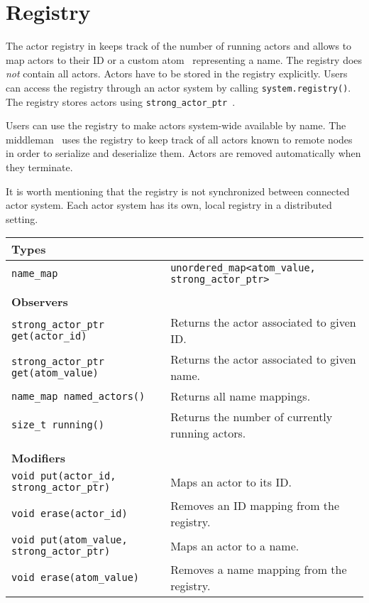 \section{Registry}
\label{registry}

The actor registry in \lib keeps track of the number of running actors and allows to map actors to their ID or a custom atom~ representing a name. The registry does \emph{not} contain all actors. Actors have to be stored in the registry explicitly. Users can access the registry through an actor system by calling \lstinline^system.registry()^. The registry stores actors using \lstinline^strong_actor_ptr^~.

Users can use the registry to make actors system-wide available by name. The middleman~ uses the registry to keep track of all actors known to remote nodes in order to serialize and deserialize them. Actors are removed automatically when they terminate.

It is worth mentioning that the registry is not synchronized between connected actor system. Each actor system has its own, local registry in a distributed setting.

{\small
\begin{tabular*}{\textwidth}{m{}m{}}
  \multicolumn{2}{l}{\textbf{Types}\vspace{3pt}} \\
  \hline
  \lstinline^name_map^ & \lstinline^unordered_map<atom_value, strong_actor_ptr>^ \\
  \hline
  \\
  \multicolumn{2}{l}{\textbf{Observers}\vspace{3pt}} \\
  \hline
  \lstinline^strong_actor_ptr get(actor_id)^ & Returns the actor associated to given ID. \\
  \hline
  \lstinline^strong_actor_ptr get(atom_value)^ & Returns the actor associated to given name. \\
  \hline
  \lstinline^name_map named_actors()^ & Returns all name mappings. \\
  \hline
  \lstinline^size_t running()^ & Returns the number of currently running actors. \\
  \hline
  \\
  \multicolumn{2}{l}{\textbf{Modifiers}\vspace{3pt}} \\
  \hline
  \lstinline^void put(actor_id, strong_actor_ptr)^ & Maps an actor to its ID. \\
  \hline
  \lstinline^void erase(actor_id)^ & Removes an ID mapping from the registry. \\
  \hline
  \lstinline^void put(atom_value, strong_actor_ptr)^ & Maps an actor to a name. \\
  \hline
  \lstinline^void erase(atom_value)^ & Removes a name mapping from the registry. \\
  \hline
\end{tabular*}
}